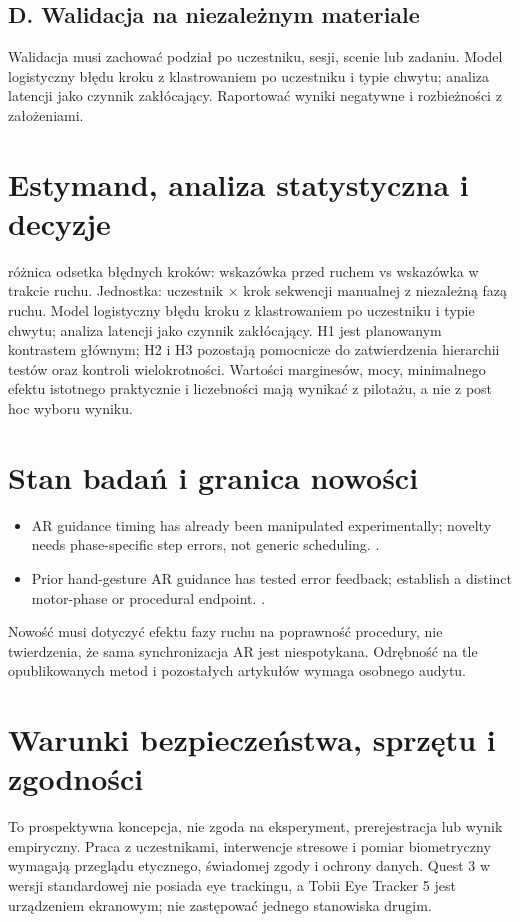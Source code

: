 \documentclass[11pt,a4paper]{article}
\begin{document}
\subsection{D. Walidacja na niezależnym materiale}
Walidacja musi zachować podział po uczestniku, sesji, scenie lub zadaniu. Model logistyczny błędu kroku z klastrowaniem po uczestniku i typie chwytu; analiza latencji jako czynnik zakłócający. Raportować wyniki negatywne i rozbieżności z założeniami.
\section{Estymand, analiza statystyczna i decyzje}
różnica odsetka błędnych kroków: wskazówka przed ruchem vs wskazówka w trakcie ruchu. Jednostka: uczestnik × krok sekwencji manualnej z niezależną fazą ruchu. Model logistyczny błędu kroku z klastrowaniem po uczestniku i typie chwytu; analiza latencji jako czynnik zakłócający. H1 jest planowanym kontrastem głównym; H2 i H3 pozostają pomocnicze do zatwierdzenia hierarchii testów oraz kontroli wielokrotności. Wartości marginesów, mocy, minimalnego efektu istotnego praktycznie i liczebności mają wynikać z pilotażu, a nie z post hoc wyboru wyniku.
\section{Stan badań i granica nowości}
\begin{itemize}
\item AR guidance timing has already been manipulated experimentally; novelty needs phase-specific step errors, not generic scheduling. \cite{xrprior1}.
\item Prior hand-gesture AR guidance has tested error feedback; establish a distinct motor-phase or procedural endpoint. \cite{xrprior2}.
\end{itemize}
Nowość musi dotyczyć efektu fazy ruchu na poprawność procedury, nie twierdzenia, że sama synchronizacja AR jest niespotykana. Odrębność na tle opublikowanych metod i pozostałych artykułów wymaga osobnego audytu.
\section{Warunki bezpieczeństwa, sprzętu i zgodności}
To prospektywna koncepcja, nie zgoda na eksperyment, prerejestracja lub wynik empiryczny. Praca z uczestnikami, interwencje stresowe i pomiar biometryczny wymagają przeglądu etycznego, świadomej zgody i ochrony danych. Quest 3 w wersji standardowej nie posiada eye trackingu, a Tobii Eye Tracker 5 jest urządzeniem ekranowym; nie zastępować jednego stanowiska drugim.
\end{document}
